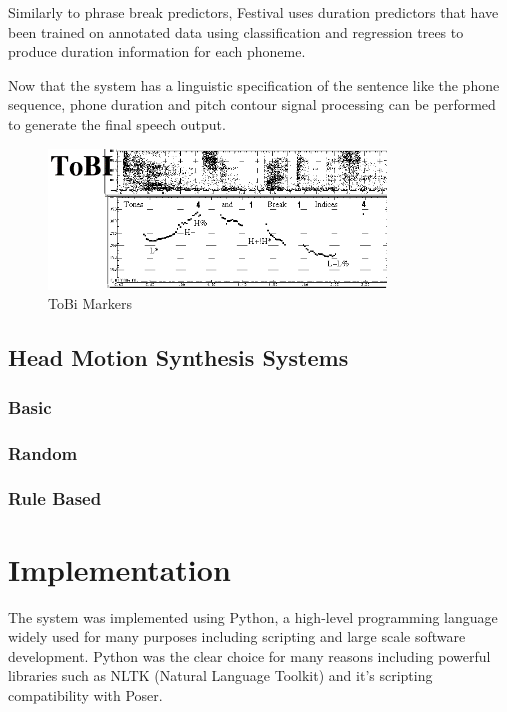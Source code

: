 \documentclass[bsc,frontabs,twoside,singlespacing,parskip]{infthesis}
\begin{document}
Similarly to phrase break predictors, Festival uses duration predictors that have been trained on annotated data using classification and regression trees to produce duration information for each phoneme.

Now that the system has a linguistic specification of the sentence like the phone sequence, phone duration and pitch contour signal processing can be performed to generate the final speech output.

\begin{figure}[h!]
	\centering
	\includegraphics[width=0.8\textwidth]{tobi.png}
	\caption{ToBi Markers}
\end{figure}


\section{Head Motion Synthesis Systems}

\subsection{Basic}

\subsection{Random}

\subsection{Rule Based}

\chapter{Implementation}

The system was implemented using Python, a high-level programming language widely used for many purposes including scripting and large scale software development. Python was the clear choice for many reasons including powerful libraries such as NLTK (Natural Language Toolkit) \cite{nltk} and it's scripting compatibility with Poser. 
\end{document}
